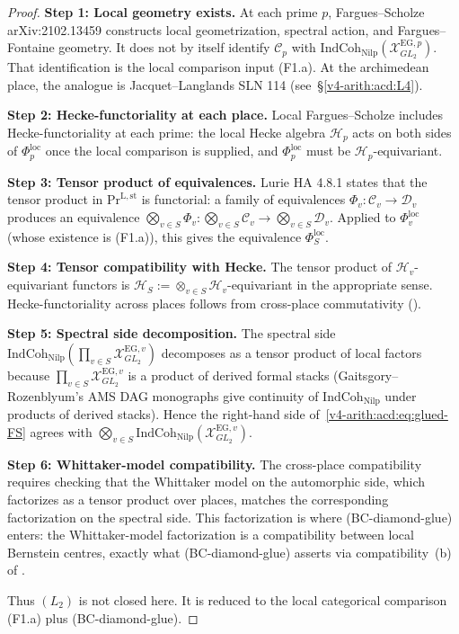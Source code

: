 \begin{proof}
\textbf{Step 1: Local geometry exists.} At each prime \(p\),
Fargues--Scholze arXiv:2102.13459 constructs local geometrization,
spectral action, and Fargues--Fontaine geometry. It does not by
itself identify \(\mathcal{C}_{p}\) with
\(\mathrm{IndCoh}_{\mathrm{Nilp}}(\mathcal{X}^{\mathrm{EG},p}_{GL_{2}})\).
That identification is the local comparison input (F1.a). At the
archimedean place, the analogue is Jacquet--Langlands SLN 114
(see~\S\ref{v4-arith:acd:L4}).

\textbf{Step 2: Hecke-functoriality at each place.} Local
Fargues--Scholze includes Hecke-functoriality at each prime: the
local Hecke algebra \(\mathcal{H}_{p}\) acts on both sides of
\(\Phi_{p}^{\mathrm{loc}}\) once the local comparison is supplied, and
\(\Phi_{p}^{\mathrm{loc}}\) must be
\(\mathcal{H}_{p}\)-equivariant.

\textbf{Step 3: Tensor product of equivalences.} Lurie HA 4.8.1
states that the tensor product in \(\mathrm{Pr}^{\mathrm{L,st}}\) is
functorial: a family of equivalences
\(\Phi_{v}:\mathcal{C}_{v}\to\mathcal{D}_{v}\) produces an equivalence
\(\bigotimes_{v\in S}\Phi_{v}:\bigotimes_{v\in S}\mathcal{C}_{v}\to\bigotimes_{v\in S}\mathcal{D}_{v}\).
Applied to \(\Phi_{v}^{\mathrm{loc}}\) (whose existence is (F1.a)),
this gives the equivalence \(\Phi_{S}^{\mathrm{loc}}\).

\textbf{Step 4: Tensor compatibility with Hecke.} The tensor product
of \(\mathcal{H}_{v}\)-equivariant functors is
\(\mathcal{H}_{S}:=\otimes_{v\in S}\mathcal{H}_{v}\)-equivariant in the
appropriate sense. Hecke-functoriality across places follows from
cross-place commutativity
().

\textbf{Step 5: Spectral side decomposition.} The spectral side
\(\mathrm{IndCoh}_{\mathrm{Nilp}}(\prod_{v\in S}\mathcal{X}^{\mathrm{EG},v}_{GL_{2}})\)
decomposes as a tensor product of local factors because
\(\prod_{v\in S}\mathcal{X}^{\mathrm{EG},v}_{GL_{2}}\) is a product of
derived formal stacks (Gaitsgory--Rozenblyum's AMS DAG monographs give
continuity of \(\mathrm{IndCoh}_{\mathrm{Nilp}}\) under products of
derived stacks). Hence the right-hand side
of~\eqref{v4-arith:acd:eq:glued-FS} agrees with
\(\bigotimes_{v\in S}\mathrm{IndCoh}_{\mathrm{Nilp}}(\mathcal{X}^{\mathrm{EG},v}_{GL_{2}})\).

\textbf{Step 6: Whittaker-model compatibility.} The cross-place
compatibility requires checking that the Whittaker model on the
automorphic side, which factorizes as a tensor product over places,
matches the corresponding factorization on the spectral side. This
factorization is where (BC-diamond-glue) enters: the Whittaker-model
factorization is a compatibility between local Bernstein centres,
exactly what (BC-diamond-glue) asserts via compatibility~(b) of
.

Thus \((L_{2})\) is not closed here. It is reduced to the local
categorical comparison (F1.a) plus (BC-diamond-glue).
\end{proof}


